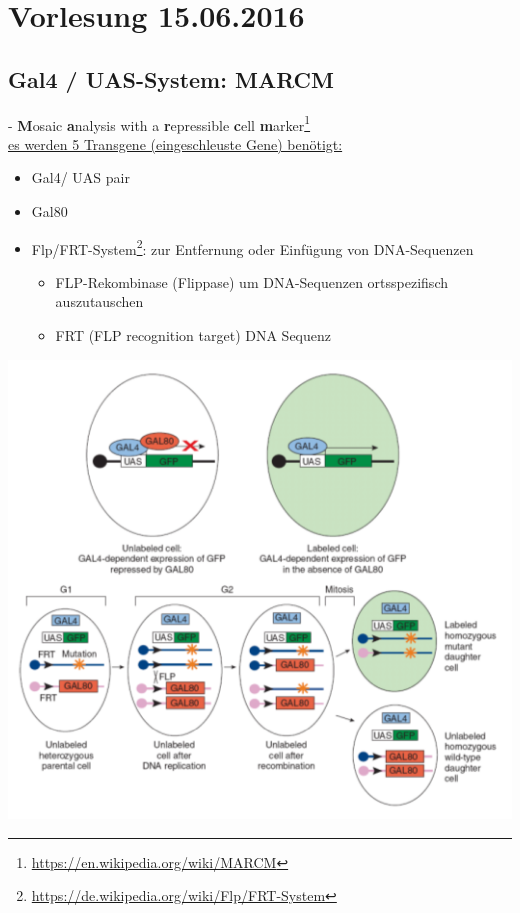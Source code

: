 \section{Vorlesung 15.06.2016}

\subsection{Gal4 / UAS-System: MARCM}
 - \textbf{M}osaic \textbf{a}nalysis with a \textbf{r}epressible \textbf{c}ell \textbf{m}arker\footnote{\url{https://en.wikipedia.org/wiki/MARCM}}\\

\underline{es werden 5 Transgene (eingeschleuste Gene) benötigt:}
\begin{itemize}
	\item Gal4/ UAS pair
	\item Gal80
	\item Flp/FRT-System\footnote{\url{https://de.wikipedia.org/wiki/Flp/FRT-System}}: zur Entfernung oder Einfügung von DNA-Sequenzen
		\begin{itemize}
			\item FLP-Rekombinase (Flippase) um DNA-Sequenzen ortsspezifisch auszutauschen
			\item FRT (FLP recognition target) DNA Sequenz
		\end{itemize}
\end{itemize}

\includegraphics[width=1\textwidth]{lectures/160615/pix/marcm.png}


